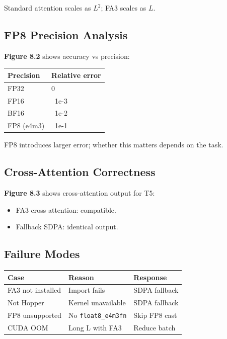Standard attention scales as $L^2$; FA3 scales as $L$.

\subsection{FP8 Precision Analysis}

\textbf{Figure 8.2} shows accuracy vs precision:

\begin{table}[H]
\centering
\small
\begin{tabular}{ll}
\toprule
\textbf{Precision} & \textbf{Relative error} \\
\midrule
FP32 & 0 \\
FP16 & ~1e-3 \\
BF16 & ~1e-2 \\
FP8 (e4m3) & ~1e-1 \\
\bottomrule
\end{tabular}
\end{table}

FP8 introduces larger error; whether this matters depends on the task.

\subsection{Cross-Attention Correctness}

\textbf{Figure 8.3} shows cross-attention output for T5:

\begin{itemize}
\item FA3 cross-attention: compatible.
\item Fallback SDPA: identical output.

\end{itemize}
\subsection{Failure Modes}

\begin{table}[H]
\centering
\small
\begin{tabular}{lll}
\toprule
\textbf{Case} & \textbf{Reason} & \textbf{Response} \\
\midrule
FA3 not installed & Import fails & SDPA fallback \\
Not Hopper & Kernel unavailable & SDPA fallback \\
FP8 unsupported & No \texttt{float8\_e4m3fn} & Skip FP8 cast \\
CUDA OOM & Long L with FA3 & Reduce batch \\
\bottomrule
\end{tabular}
\end{table}

